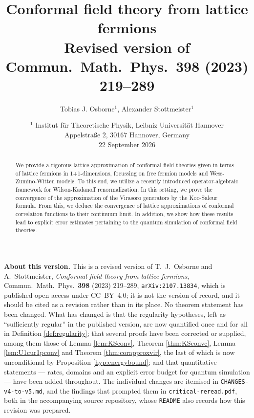 \documentclass[a4paper, 11pt]{article}
\DeclareMathOperator{\1}{\mathds{1}}
\begin{document}

\title{Conformal field theory from lattice fermions\\[0.25cm]
\large\normalfont Revised version of Commun.\ Math.\ Phys.\ \textbf{398} (2023) 219--289}
\author{Tobias J. Osborne${}^{1}$, Alexander Stottmeister${}^{1}$}
\date{
\small{${}^{1}$ Institut f\"ur Theoretische Physik, Leibniz Universit\"at Hannover
\\Appelstra\ss e 2, 30167 Hannover, Germany} \\[0.5cm]
22 September 2026}
\maketitle

\begin{center}
\begin{minipage}{0.9\textwidth}
\small
\noindent\textbf{About this version.} This is a revised version of T.~J.~Osborne and
A.~Stottmeister, \emph{Conformal field theory from lattice fermions}, Commun.\ Math.\ Phys.\
\textbf{398} (2023) 219--289, \texttt{arXiv:2107.13834}, which is published open access under
CC~BY~4.0; it is not the version of record, and it should be cited as a revision rather than in
its place. No theorem statement has been changed. What has changed is that the regularity
hypotheses, left as ``sufficiently regular'' in the published version, are now quantified once
and for all in Definition \ref{def:regularity}; that several proofs have been corrected or
supplied, among them those of Lemma \ref{lem:KSconv}, Theorem \ref{thm:KSconvc},
Lemma \ref{lem:U1cur1pconv} and Theorem \ref{thm:corapproxvir}, the last of which is now
unconditional by Proposition \ref{hyp:energybound}; and that quantitative statements --- rates,
domains and an explicit error budget for quantum simulation --- have been added throughout. The
individual changes are itemised in \texttt{CHANGES-v4-to-v5.md}, and the findings that prompted
them in \texttt{critical-reread.pdf}, both in the accompanying source repository, whose
\texttt{README} also records how this revision was prepared.
\end{minipage}
\end{center}

\begin{abstract}
We provide a rigorous lattice approximation of conformal field theories given in terms of lattice fermions in 1+1-dimensions, focussing on free fermion models and Wess-Zumino-Witten models. To this end, we utilize a recently introduced operator-algebraic framework for Wilson-Kadanoff renormalization. In this setting, we prove the convergence of the approximation of the Virasoro generators by the Koo-Saleur formula. From this, we deduce the convergence of lattice approximations of conformal correlation functions to their continuum limit. In addition, we show how these results lead to explicit error estimates pertaining to the quantum simulation of conformal field theories.
\end{abstract}
\end{document}
